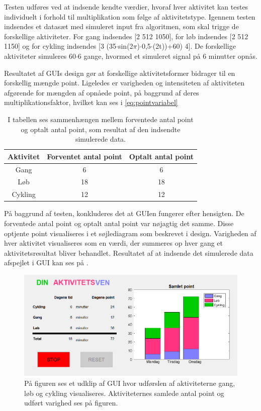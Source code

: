 Testen udføres ved at indsende kendte værdier, hvoraf hver aktivitet kan testes individuelt i forhold til multiplikation som følge af aktivitetstype.
Igennem testen indsendes et datasæt med simuleret input fra algoritmen, som skal trigge de forskellige aktiviteter. For gang indsendes [2 512 1050], for løb indsendes [2 512 1150] og for cykling indsendes [3 (35$\cdot$sin(2$\pi$)$\cdot$0,5$\cdot$(2t))+60) 4]. De forskellige aktiviteter simuleres 60$\cdot$6 gange, hvormed et simuleret signal på 6 minutter opnås.

Resultatet af GUIs design gør at forskellige aktivitetsformer bidrager til en forskellig mængde point. Ligeledes er varigheden og intensiteten  af aktiviteten afgørende for mængden af opnåede point, på baggrund af deres multiplikationsfaktor, hvilket kan ses i \eqref{eq:pointvariabel}
\begin{table}[H]
	\centering
	\begin{tabular}{ccc}
		\hline
		\rowcolor[HTML]{C0C0C0} 
		Aktivitet 	& Forventet antal point & Optalt antal point \\ \hline
		Gang 	&  6 & 6  \\ \hline
		Løb 	& 18 & 18 \\ \hline
		Cykling & 12 & 12 \\ \hline
	\end{tabular}
	\caption{I tabellen ses sammenhængen mellem forventede antal point og optalt antal point, som resultat af den indsendte simulerede data.}
	\label{test:GUI}
\end{table}\vspace{-.5cm}
På baggrund af testen, konkluderes det at GUIen fungerer efter hensigten. De forventede antal point og optalt antal point var nøjagtig det samme. Disse optjente point visualiseres i et søjlediagram som beskrevet i design. Varigheden af hver aktivitet visualiseres som en værdi, der summeres op hver gang et aktivitetsresultat bliver behandlet. Resultatet af at indsende det simulerede data afspejlet i GUI kan ses på .

\begin{figure}[H]
	\centering
	\includegraphics[scale=0.7]{figures/cDesign/test_GUI.png}
	\caption{På figuren ses et udklip af GUI hvor udførslen af aktiviteterne gang, løb og cykling visualiseres. Aktiviteternes samlede antal point og udført varighed ses på figuren.}
	\label{fig:GUI2}
\end{figure}

